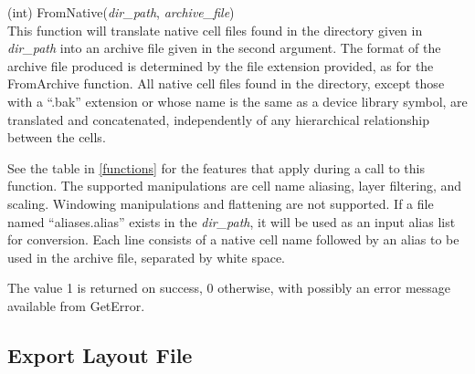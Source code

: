 \begin{description}
\item{(int) \vt FromNative({\it dir\_path\/}, {\it archive\_file\/})}\\
This function will translate native cell files found in the directory
given in {\it dir\_path} into an archive file given in the second
argument.  The format of the archive file produced is determined by
the file extension provided, as for the {\vt FromArchive} function. 
All native cell files found in the directory, except those with a
``{\vt .bak}'' extension or whose name is the same as a device library
symbol, are translated and concatenated, independently of any
hierarchical relationship between the cells.

See the table in \ref{functions} for the features that apply during a
call to this function.  The supported manipulations are cell name
aliasing, layer filtering, and scaling.  Windowing manipulations and
flattening are not supported.  If a file named ``{\vt aliases.alias}''
exists in the {\it dir\_path}, it will be used as an input alias list
for conversion.  Each line consists of a native cell name followed by
an alias to be used in the archive file, separated by white space.

The value 1 is returned on success, 0 otherwise, with possibly an
error message available from {\vt GetError}.

\end{description}


\subsection{Export Layout File}

